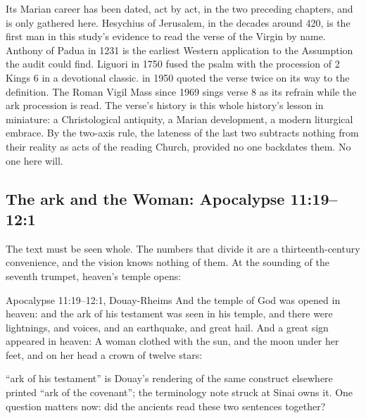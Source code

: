 Its Marian career has been dated, act by act, in the two preceding
chapters, and is only gathered here. Hesychius of Jerusalem, in the
decades around 420, is the first man in this study's evidence to read the
verse of the Virgin by name. Anthony of Padua in 1231 is the earliest
Western application to the Assumption the audit could find. Liguori in
1750 fused the psalm with the procession of 2 Kings 6 in a devotional
classic.  in 1950 quoted the verse twice on
its way to the definition. The Roman Vigil Mass since 1969 sings verse 8
as its refrain while the ark procession is read. The verse's history is
this whole history's lesson in miniature: a Christological antiquity, a
Marian development, a modern liturgical embrace. By the two-axis rule,
the lateness of the last two subtracts nothing from their
reality as acts of the reading Church, provided no one backdates them. No
one here will.

\subsection{The ark and the Woman: Apocalypse 11:19--12:1}

The text must be seen whole. The numbers that divide it are a
thirteenth-century convenience, and the vision knows nothing of them. At
the sounding of the seventh trumpet, heaven's temple opens:

\begin{witnessbox}{Apocalypse 11:19--12:1, Douay-Rheims}
And the temple of God was opened in heaven: and the ark of his testament
was seen in his temple, and there were lightnings, and voices, and an
earthquake, and great hail. And a great sign appeared in heaven: A woman
clothed with the sun, and the moon under her feet, and on her head a crown
of twelve stars:
\end{witnessbox}

\noindent
``ark of his testament'' is Douay's rendering of the same construct
elsewhere printed ``ark of the covenant''; the terminology note struck at
Sinai owns it. One question matters now: did the ancients
read these two sentences together?

